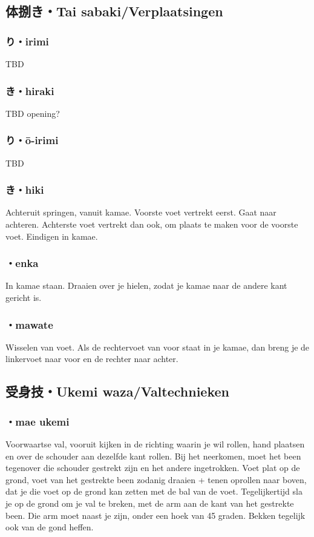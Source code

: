 \subsection{体捌き・Tai sabaki/Verplaatsingen}
\subsubsection{り・irimi}
TBD

\subsubsection{き・hiraki}
TBD opening?

\subsubsection{り・\={o}-irimi}
TBD

\subsubsection{き・hiki}
Achteruit springen, vanuit kamae. Voorste voet vertrekt eerst. Gaat naar achteren. Achterste voet vertrekt dan ook, om plaats te maken voor de voorste voet. Eindigen in kamae.

\subsubsection{\ruby{}{}・enka}
In kamae staan. Draaien over je hielen, zodat je kamae naar de andere kant gericht is.

\subsubsection{\ruby{}{}・mawate}
Wisselen van voet. Als de rechtervoet van voor staat in je kamae, dan breng je de linkervoet naar voor en de rechter naar achter.

\subsection{受身技・Ukemi waza/Valtechnieken}
\subsubsection{・mae ukemi}
Voorwaartse val, vooruit kijken in de richting waarin je wil rollen, hand plaatsen en over de schouder aan dezelfde kant rollen. Bij het neerkomen, moet het been tegenover die schouder gestrekt zijn en het andere ingetrokken. Voet plat op de grond, voet van het gestrekte been zodanig draaien + tenen oprollen naar boven, dat je die voet op de grond kan zetten met de bal van de voet. Tegelijkertijd sla je op de grond om je val te breken, met de arm aan de kant van het gestrekte been. Die arm moet naast je zijn, onder een hoek van 45 graden. Bekken tegelijk ook van de gond heffen.

